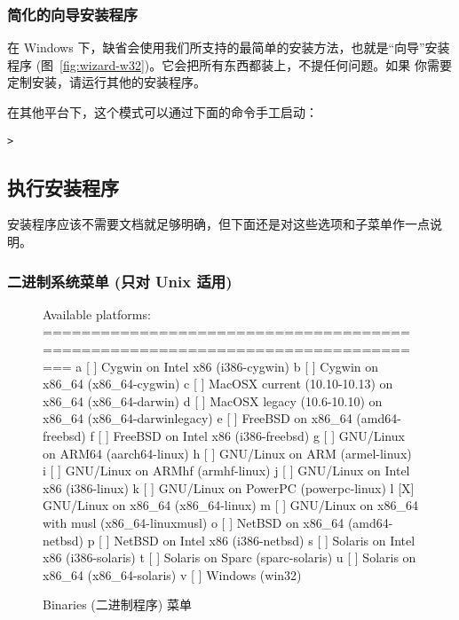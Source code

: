 \documentclass{article}
\begin{document}
\subsubsection{简化的向导安装程序}

在 Windows 下，缺省会使用我们所支持的最简单的安装方法，也就是“向导”安装
程序 (图~\ref{fig:wizard-w32})。它会把所有东西都装上，不提任何问题。如果
你需要定制安装，请运行其他的安装程序。

在其他平台下，这个模式可以通过下面的命令手工启动：
\begin{alltt}
> 
\end{alltt}


\subsection{执行安装程序}
\label{sec:runinstall}

安装程序应该不需要文档就足够明确，但下面还是对这些选项和子菜单作一点说明。

\subsubsection{二进制系统菜单 (只对 Unix 适用)}
\label{sec:binary}

\begin{figure}[tb]
\begin{boxedverbatim}
Available platforms:
===============================================================================
   a [ ] Cygwin on Intel x86 (i386-cygwin)
   b [ ] Cygwin on x86_64 (x86_64-cygwin)
   c [ ] MacOSX current (10.10-10.13) on x86_64 (x86_64-darwin)
   d [ ] MacOSX legacy (10.6-10.10) on x86_64 (x86_64-darwinlegacy)
   e [ ] FreeBSD on x86_64 (amd64-freebsd)
   f [ ] FreeBSD on Intel x86 (i386-freebsd)
   g [ ] GNU/Linux on ARM64 (aarch64-linux)
   h [ ] GNU/Linux on ARM (armel-linux)
   i [ ] GNU/Linux on ARMhf (armhf-linux)
   j [ ] GNU/Linux on Intel x86 (i386-linux)
   k [ ] GNU/Linux on PowerPC (powerpc-linux)
   l [X] GNU/Linux on x86_64 (x86_64-linux)
   m [ ] GNU/Linux on x86_64 with musl (x86_64-linuxmusl)
   o [ ] NetBSD on x86_64 (amd64-netbsd)
   p [ ] NetBSD on Intel x86 (i386-netbsd)
   s [ ] Solaris on Intel x86 (i386-solaris)
   t [ ] Solaris on Sparc (sparc-solaris)
   u [ ] Solaris on x86_64 (x86_64-solaris)
   v [ ] Windows (win32)
\end{boxedverbatim}
\caption{Binaries (二进制程序) 菜单}\label{fig:bin-text}
\end{figure}
\end{document}
